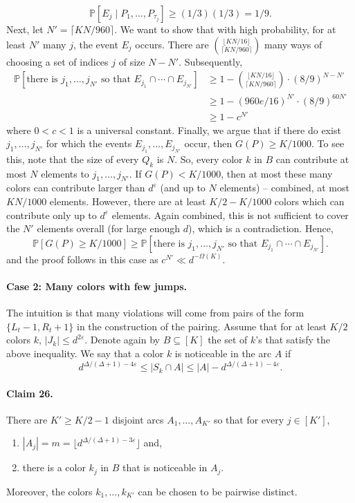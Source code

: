 \documentclass[10pt,a4paper]{article}
\begin{document}
\[\mathbb P[E_j\mid P_1,\ldots,P_{\tau_j}]\geq(1/3)(1/3)=1/9.\]
Next, let $N'=\lceil KN/960\rceil$. We want to show that with high probability, for at least $N'$ many $j$, the event $E_j$ occurs. There are $\binom{\lfloor KN/16\rfloor}{\lceil KN/960\rceil}$ many ways of choosing a set of indices $j$ of size $N-N'$. Subsequently,
\begin{align*}
\mathbb P[\text{there is }j_1,\ldots,j_{N'}\text{ so that }E_{j_1}\cap\cdots\cap E_{j_{N'}}]
&\geq1-\binom{\lfloor KN/16\rfloor}{\lceil KN/960\rceil}\cdot(8/9)^{N-N'}\\
&\geq1-(960e/16)^{N'}\cdot(8/9)^{60N'}\\
&\geq1-c^{N'}
\end{align*}
where $0<c<1$ is a universal constant. Finally, we argue that if there do exist $j_1,\ldots,j_{N'}$ for which the events $E_{j_1},\ldots,E_{j_{N'}}$ occur, then $G(P)\geq K/1000$. To see this, note that the size of every $Q_k$ is $N$. So, every color $k$ in $B$ can contribute at most $N$ elements to $j_1,\ldots,j_{N'}$. If $G(P)<K/1000$, then at most these many colors can contribute larger than $d^\varepsilon$ (and up to $N$ elements) -- combined, at most $KN/1000$ elements. However, there are at least $K/2-K/1000$ colors which can contribute only up to $d^\varepsilon$ elements. Again combined, this is not sufficient to cover the $N'$ elements overall (for large enough $d$), which is a contradiction. Hence,
\[\mathbb P[G(P)\geq K/1000]\geq\mathbb P[\text{there is }j_1,\ldots,j_{N'}\text{ so that }E_{j_1}\cap\cdots\cap E_{j_{N'}}].\]
and the proof follows in this case as $c^{N'}\ll d^{-\Omega(K)}$.
\paragraph{Case 2: Many colors with few jumps.}
The intuition is that many violations will come from pairs of the form $\{L_t-1,R_t+1\}$ in the construction of the pairing. Assume that for at least $K/2$ colors $k$, $|J_k|\leq d^{2\varepsilon}$. Denote again by $B\subseteq[K]$ the set of $k$'s that satisfy the above inequality. We say that a color $k$ is noticeable in the arc $A$ if
\[d^{\Delta/(\Delta+1)-4\varepsilon}\leq|S_k\cap A|\leq|A|-d^{\Delta/(\Delta+1)-4\varepsilon}.\]
\paragraph{Claim 26.} There are $K'\geq K/2-1$ disjoint arcs $A_1,\ldots,A_{K'}$ so that for every $j\in[K']$,
\begin{enumerate}
\item $|A_j|=m=\lfloor d^{\Delta/(\Delta+1)-3\varepsilon}\rfloor$ and,
\item there is a color $k_j$ in $B$ that is noticeable in $A_j$.
\end{enumerate}
Moreover, the colors $k_1,\ldots,k_{K'}$ can be chosen to be pairwise distinct.
\end{document}
